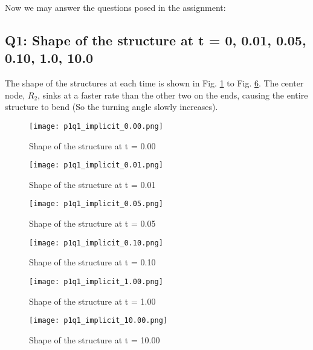 \documentclass[letterpaper, 10 pt, conference]{ieeeconf}  %
\begin{document}
Now we may answer the questions posed in the assignment:

\subsection*{Q1: Shape of the structure at t = {0, 0.01, 0.05, 0.10, 1.0, 10.0}}


The shape of the structures at each time is shown in Fig. \ref{"fig:p1q1_0.00"} to Fig. \ref{"fig:p1q1_10.00"}. The center node, $R_2$, sinks at a faster rate than the other two on the ends, causing the entire structure to bend (So the turning angle slowly increases). 

\begin{figure}[!ht]
        \centering
        \texttt{[image: p1q1\_implicit\_0.00.png]}
        \caption{Shape of the structure at t = 0.00}
        \label{"fig:p1q1_0.00"}
\end{figure}

\begin{figure}[!ht]
        \centering
        \texttt{[image: p1q1\_implicit\_0.01.png]}
        \caption{Shape of the structure at t = 0.01}
        \label{"fig:p1q1_0.01"}
\end{figure}


\begin{figure}[!ht]
        \centering
        \texttt{[image: p1q1\_implicit\_0.05.png]}
        \caption{Shape of the structure at t = 0.05}
        \label{"fig:p1q1_0.05"}
\end{figure}


\begin{figure}[!ht]
        \centering
        \texttt{[image: p1q1\_implicit\_0.10.png]}
        \caption{Shape of the structure at t = 0.10}
        \label{"fig:p1q1_0.10"}
\end{figure}


\begin{figure}[!ht]
        \centering
        \texttt{[image: p1q1\_implicit\_1.00.png]}
        \caption{Shape of the structure at t = 1.00}
        \label{"fig:p1q1_1.00"}
\end{figure}


\begin{figure}[!ht]
        \centering
        \texttt{[image: p1q1\_implicit\_10.00.png]}
        \caption{Shape of the structure at t = 10.00}
        \label{"fig:p1q1_10.00"}
\end{figure}
\end{document}
